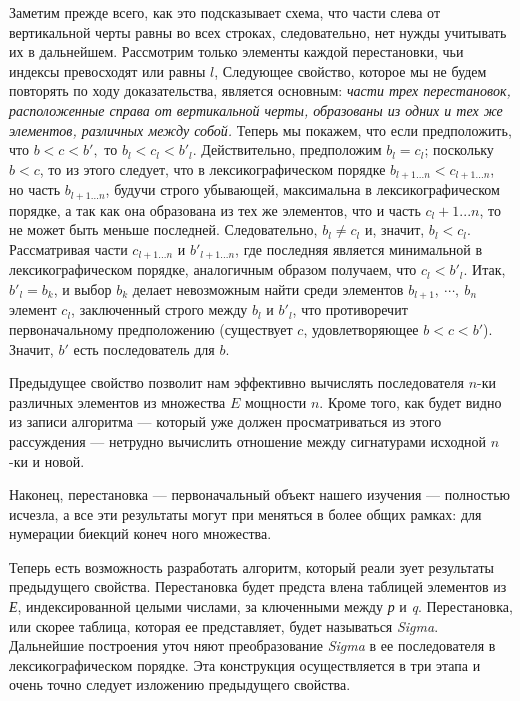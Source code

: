 \documentclass{../../template/mai_book}
\begin{document}
{\begin{myproof}
Заметим прежде всего, как это подсказывает схема, что части  
слева от вертикальной черты равны во всех строках, следовательно, 
нет нужды учитывать их в дальнейшем. Рассмотрим только  
элементы каждой перестановки, чьи индексы превосходят или равны $l$, 
Следующее свойство, которое мы не будем повторять по ходу  
доказательства, является основным: \textit{части трех перестановок,  
расположенные справа от вертикальной черты, образованы из одних 
и тех же элементов, различных между собой.}\newline 
Теперь мы покажем, что если предположить, что $b < c < b',$ 
то $b_l < c_l < b'_l$. Действительно, предположим $b_l = c_l$;  
поскольку $b < c$, то из этого следует, что в лексикографическом порядке 
$b_{l+1...n} < c_{l+1...n}$, но часть $b_{l+1...n}$, будучи строго убывающей,  
максимальна в лексикографическом порядке, а так как она образована 
из тех же элементов, что и часть $c_l+1...n$, то не может быть меньше 
последней. Следовательно, $b_l \neq c_l$ и, значит, $b_l < c_l$.  
Рассматривая части $c_{l+1...n}$ и $b'_{l+1...n}$, где последняя является минимальной в 
лексикографическом порядке, аналогичным образом получаем, что 
$c_l < b'_l$. Итак, $b'_l = b_k$, и выбор $b_k$ делает невозможным найти среди 
элементов $b_{l+1},\: \cdots,\: b_n$ элемент $c_l$, заключенный строго между $b_l$ и 
$b'_l$, что противоречит первоначальному предположению  
(существует $c$, удовлетворяющее $b < c < b'$). Значит, $b'$ есть последователь 
для $b$. 
\end{myproof}

\begin{mynotice}
Предыдущее свойство позволит нам эффективно 
вычислять последователя $n$-ки различных элементов из  
множества $E$ мощности $n$. 
Кроме того, как будет видно из записи алгоритма — который 
уже должен просматриваться из этого рассуждения — нетрудно 
вычислить отношение между сигнатурами исходной $n$-ки и новой. 
\end{mynotice}

\begin{center}
\parbox{11cm}
{
\hspace{0.4cm} Наконец,  перестановка  —  первоначальный  объект  нашего
изучения — полностью исчезла, а все эти результаты могут при­
меняться в более общих рамках:  для нумерации биекций конеч­
ного множества.
}
\end{center}

Теперь  есть  возможность  разработать  алгоритм,  который  реали­
зует результаты предыдущего свойства. Перестановка будет предста­
влена таблицей элементов из \textit{Е},
 индексированной целыми числами, за­
ключенными между \textit{р} и \textit{q}.
 Перестановка, или скорее таблица, которая ее 
представляет, будет называться \textit{Sigma}.
  Дальнейшие построения  уточ­
няют преобразование \textit{Sigma}
 в ее  последователя в лексикографическом 
порядке.  Эта конструкция осуществляется  в три этапа и очень точно 
следует изложению предыдущего свойства.

}
\end{document}
